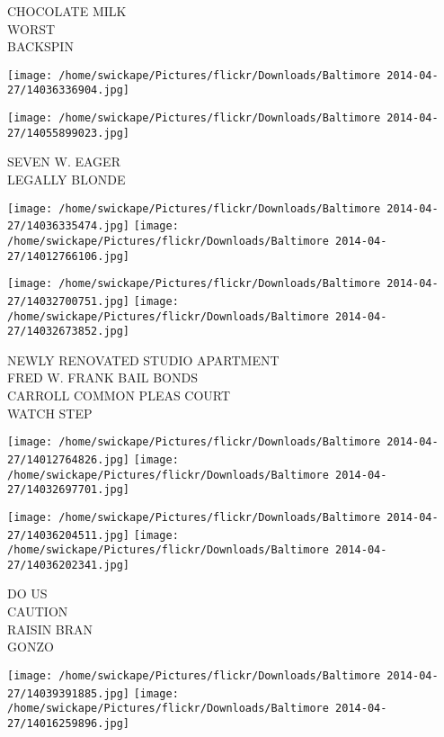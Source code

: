 \documentclass[10pt,letterpaper]{article}
\begin{document}
CHOCOLATE MILK\\
WORST\\
BACKSPIN\\
\pagebreak

\texttt{[image: /home/swickape/Pictures/flickr/Downloads/Baltimore 2014-04-27/14036336904.jpg]}

\vspace{0.25in}
\texttt{[image: /home/swickape/Pictures/flickr/Downloads/Baltimore 2014-04-27/14055899023.jpg]}

SEVEN W. EAGER\\
LEGALLY BLONDE\\
\pagebreak

\texttt{[image: /home/swickape/Pictures/flickr/Downloads/Baltimore 2014-04-27/14036335474.jpg]}
\texttt{[image: /home/swickape/Pictures/flickr/Downloads/Baltimore 2014-04-27/14012766106.jpg]}

\texttt{[image: /home/swickape/Pictures/flickr/Downloads/Baltimore 2014-04-27/14032700751.jpg]}
\texttt{[image: /home/swickape/Pictures/flickr/Downloads/Baltimore 2014-04-27/14032673852.jpg]}

NEWLY RENOVATED STUDIO APARTMENT\\
FRED W. FRANK BAIL BONDS\\
CARROLL COMMON PLEAS COURT\\
WATCH STEP\\
\pagebreak

\texttt{[image: /home/swickape/Pictures/flickr/Downloads/Baltimore 2014-04-27/14012764826.jpg]}
\texttt{[image: /home/swickape/Pictures/flickr/Downloads/Baltimore 2014-04-27/14032697701.jpg]}

\texttt{[image: /home/swickape/Pictures/flickr/Downloads/Baltimore 2014-04-27/14036204511.jpg]}
\texttt{[image: /home/swickape/Pictures/flickr/Downloads/Baltimore 2014-04-27/14036202341.jpg]}

DO US\\
CAUTION\\
RAISIN BRAN\\
GONZO\\
\pagebreak

\texttt{[image: /home/swickape/Pictures/flickr/Downloads/Baltimore 2014-04-27/14039391885.jpg]}
\texttt{[image: /home/swickape/Pictures/flickr/Downloads/Baltimore 2014-04-27/14016259896.jpg]}
\end{document}
